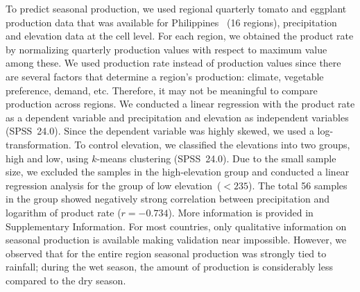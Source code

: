 \documentclass[11pt]{article}
\theoremstyle{definition}
\begin{document}
To predict seasonal production, we used regional quarterly tomato and
eggplant production data that was available for Philippines~\cite{psa} (16
regions), precipitation and elevation data at the cell level. For each
region, we obtained the product rate by normalizing quarterly production
values with respect to maximum value among these. We used production rate
instead of production values since there are several factors that determine
a region's production: climate, vegetable preference, demand, etc.
Therefore, it may not be meaningful to compare production across regions.
We conducted a linear regression with the product rate as a dependent
variable and precipitation and elevation as independent variables
(SPSS~24.0). Since the dependent variable was highly skewed, we used a
log-transformation. To control elevation, we classified the elevations into
two groups, high and low, using $k$-means clustering (SPSS~24.0). Due to
the small sample size, we excluded the samples in the high-elevation group
and conducted a linear regression analysis for the group of low
elevation~($< 235$). The total 56 samples in the group showed negatively
strong correlation between precipitation and logarithm of product rate
($r=-0.734$). More information is provided in Supplementary Information.
For most countries, only qualitative information on seasonal production is
available making validation near impossible.  However, we observed that for
the entire region seasonal production was strongly tied to rainfall; during
the wet season, the amount of production is considerably less compared to
the dry season.

\end{document}
